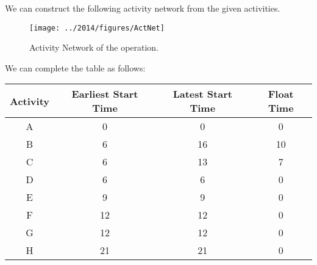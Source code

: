 %
%

\begin{subquestions}


\subquestion

\begin{subsubquestions}
	
\subsubquestion

We can construct the following activity network from the given activities.
\begin{figure}[H]
	\begin{center}
		\texttt{[image: ../2014/figures/ActNet]}
		\caption{\label{2014:q2:fig:ActNet} Activity Network of the operation.}
	\end{center}
\end{figure}


\subsubquestion

We can complete the table as follows:
\begin{table}[H]
	\centering
	\begin{tabular}{|c|c|c|c|}
		\hline
		Activity&Earliest Start Time&Latest Start Time&Float Time\\
		\hline
		A & 0 & 0 & 0 \\
		B & 6 & 16 & 10 \\
		C & 6 & 13 & 7 \\
		D & 6 & 6 & 0 \\
		E & 9 & 9 & 0 \\
		F & 12 & 12 & 0 \\
		G & 12 & 12 & 0 \\
		H & 21 & 21 & 0  \\
		\hline
		

\end{tabular}
\end{table}
\end{subsubquestions}
\end{subquestions}
